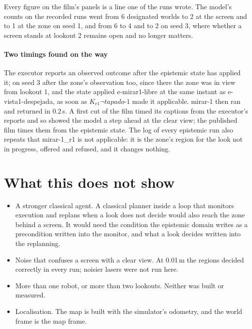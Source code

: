 \documentclass[11pt,a4paper]{article}
\theoremstyle{definition}
\newcommand{\tap}[1]{\mathit{tapado\text{-}#1}}
\newcommand{\act}[1]{\textsf{#1}}
\begin{document}
\noindent
Every figure on the film's panels is a line one of the runs wrote. The model's
counts on the recorded runs went from 6 designated worlds to 2 at the screen
and to 1 at the zone on seed 1, and from 6 to 4 and to 2 on seed 3, where
whether a screen stands at lookout 2 remains open and no longer matters.

\paragraph{Two timings found on the way}
The executor reports an observed outcome after the epistemic state has applied
it; on seed 3 after the zone's observation too, since there the zone was in view
from lookout 1, and the state applied \act{e-mirar1-libre} at the same instant
as \act{e-vista1-despejada}, as soon as $K_{r1}\neg\tap{1}$ made it applicable.
\act{mirar-1} then ran and returned in 0.2\,s. A first cut of the film timed its
captions from the executor's reports and so showed the model a step ahead at the
clear view; the published film times them from the epistemic state. The log of
every epistemic run also repeats that \act{mirar-1\_r1} is not applicable: it is
the zone's region for the look not in progress, offered and refused, and it
changes nothing.

\section{What this does not show}

\begin{itemize}[leftmargin=1.4em]
\item A stronger classical agent. A classical planner inside a loop that
monitors execution and replans when a look does not decide would also reach the
zone behind a screen. It would need the condition the epistemic domain writes as
a precondition written into the monitor, and what a look decides written into
the replanning.
\item Noise that confuses a screen with a clear view. At 0.01\,m the regions
decided correctly in every run; noisier lasers were not run here.
\item More than one robot, or more than two lookouts. Neither was built or
measured.
\item Localisation. The map is built with the simulator's odometry, and the
world frame is the map frame.
\end{itemize}
\end{document}
